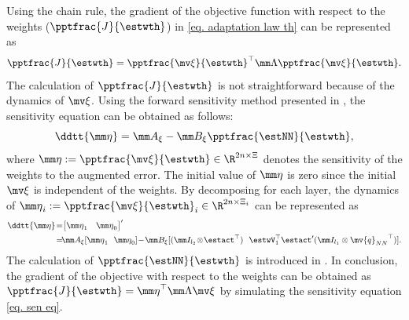 \documentclass[letterpaper, 10 pt, conference]{ieeeconf}  %
\newcommand*{\q}{\mv{q}}
\begin{document}
Using the chain rule, the gradient of the objective function with respect to the weights (\ie $\pptfrac{J}{\estwth}$) in \eqref{eq. adaptation law th} can be represented as
\begin{equation}
    \pptfrac{J}{\estwth}
    =
    \pptfrac{\mv\xi}{\estwth}^\top 
    \mm \Lambda
    \pptfrac{\mv\xi}{\estwth}
    .
\end{equation}
The calculation of $\pptfrac{J}{\estwth}$ is not straightforward because of the dynamics of $\mv\xi$.
Using the forward sensitivity method presented in \cite{Sengupta:2014aa}, the sensitivity equation can be obtained as follows:
\begin{equation}
    \ddtt{\mm \eta} =
    \mm A_\xi - \mm B_\xi 
    \pptfrac{\estNN}{\estwth}
    ,
    \label{eq. sen eq}
\end{equation}
where ${\mm \eta}:= \pptfrac{\mv\xi}{\estwth}\in\R^{2n\times \Xi}$ denotes the sensitivity of the weights to the augmented error.
The initial value of ${\mm \eta}$ is zero since the initial $\mv\xi$ is independent of the weights.
By decomposing for each layer, the dynamics of ${\mm \eta}_i:= \pptfrac{\mv\xi}{\estwth}_i\in\R^{2n\times \Xi_i}$ can be represented as
\begin{equation}
    \begin{aligned}
        \ddtt{\mm \eta} 
        \!=\!&
        \begin{bmatrix}
            {\mm \eta}_1&{\mm \eta}_0
        \end{bmatrix}'
        \\
        \!=\!&
        \mm A_\xi
        [
            {\mm \eta}_1
            \ \ 
            {\mm \eta}_0
        ]
        \!-\!
        \mm B_\xi
        [
            (\mm I_{l_2}\!\otimes\!\estact^\top )
            \ \ 
            \estwV_1^\top \estact'(\mm I_{l_1}\otimes {\q_{NN}}^\top )
        ]
        .
    \end{aligned}
\end{equation}
The calculation of $\pptfrac{\estNN}{\estwth}$ is introduced in \cite{Patil:2022aa}.
In conclusion, the gradient of the objective with respect to the weights can be obtained as $\pptfrac{J}{\estwth} = {\mm \eta}^\top\mm \Lambda\mv\xi$ by simulating the sensitivity equation \eqref{eq. sen eq}.
\end{document}
